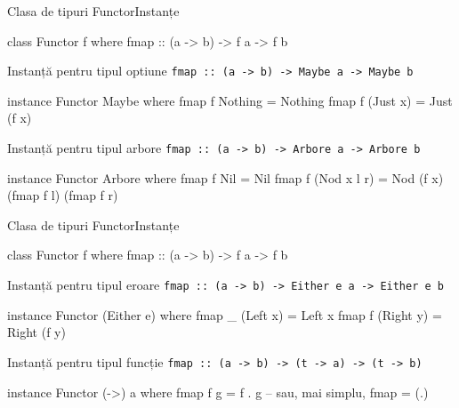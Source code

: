 \documentclass[xcolor=pdftex,romanian,colorlinks]{beamer}
\begin{document}
\begin{frame}[fragile]{Clasa de tipuri Functor}{Instanțe}
\begin{asciihs}
class Functor f where
  fmap :: (a -> b) -> f a -> f b
\end{asciihs}
\vfill
\begin{block}{Instanță pentru tipul optiune \lstinline$fmap :: (a -> b) -> Maybe a -> Maybe b$}
\begin{asciihs}
instance Functor Maybe where
  fmap f Nothing = Nothing
  fmap f (Just x) = Just (f x)
\end{asciihs}
\end{block}
\vfill
{}
\begin{block}{Instanță pentru tipul arbore \lstinline$fmap :: (a -> b) -> Arbore a -> Arbore b$}
\begin{asciihs}
instance Functor Arbore where
  fmap f Nil = Nil
  fmap f (Nod x l r) = Nod (f x) (fmap f l) (fmap f r)
\end{asciihs}
\end{block}
\end{frame}

\begin{frame}[fragile]{Clasa de tipuri Functor}{Instanțe}
\begin{asciihs}
class Functor f where
  fmap :: (a -> b) -> f a -> f b
\end{asciihs}
\vfill
\begin{block}{Instanță pentru tipul eroare \lstinline$fmap :: (a -> b) -> Either e a -> Either e b$}
\begin{asciihs}
instance Functor (Either e) where
    fmap _ (Left x) = Left x
    fmap f (Right y) = Right (f y)
\end{asciihs}
\end{block}
\vfill
{}
\begin{block}{Instanță pentru tipul funcție \lstinline$fmap :: (a -> b) -> (t -> a) -> (t -> b)$}
\begin{asciihs}
instance Functor (->) a where
  fmap f g = f . g  -- sau, mai simplu, fmap = (.)
\end{asciihs}
\end{block}
\end{frame}
\end{document}
